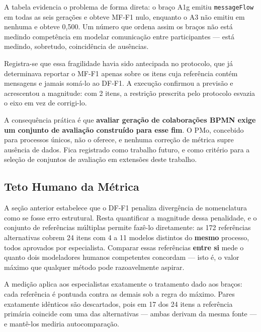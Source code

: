 A tabela evidencia o problema de forma direta: o braço A1g emitiu \texttt{messageFlow} em todas as seis gerações e obteve MF-F1 nulo, enquanto o A3 não emitiu em nenhuma e obteve 0,500. Um número que ordena assim os braços não está medindo competência em modelar comunicação entre participantes --- está medindo, sobretudo, coincidência de ausências.

Registra-se que essa fragilidade havia sido antecipada no protocolo, que já determinava reportar o MF-F1 apenas sobre os itens cuja referência contém mensagens e jamais somá-lo ao DF-F1. A execução confirmou a previsão e acrescentou a magnitude: com 2 itens, a restrição prescrita pelo protocolo esvazia o eixo em vez de corrigi-lo.

A consequência prática é que \textbf{avaliar geração de colaborações BPMN exige um conjunto de avaliação construído para esse fim}. O PMo, concebido para processos únicos, não o oferece, e nenhuma correção de métrica supre ausência de dados. Fica registrado como trabalho futuro, e como critério para a seleção de conjuntos de avaliação em extensões deste trabalho.

\subsection{Teto Humano da Métrica}
\label{subsec:res-teto}

A seção anterior estabelece que o DF-F1 penaliza divergência de nomenclatura como se fosse erro estrutural. Resta quantificar a magnitude dessa penalidade, e o conjunto de referências múltiplas permite fazê-lo diretamente: as 172 referências alternativas cobrem 24 itens com 4 a 11 modelos distintos do \textbf{mesmo} processo, todos aprovados por especialista. Comparar essas referências \textbf{entre si} mede o quanto dois modeladores humanos competentes concordam --- isto é, o valor máximo que qualquer método pode razoavelmente aspirar.

A medição aplica aos especialistas exatamente o tratamento dado aos braços: cada referência é pontuada contra as demais sob a regra do máximo. Pares exatamente idênticos são descartados, pois em 17 dos 24 itens a referência primária coincide com uma das alternativas --- ambas derivam da mesma fonte --- e mantê-los mediria autocomparação.

